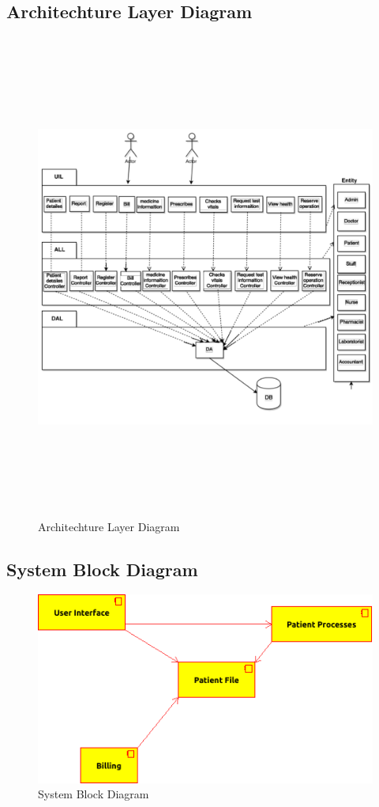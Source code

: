 \documentclass[14pt]{article}
\begin{document}
\subsection{Architechture Layer Diagram}
\begin{figure}[h!]
\centering 
  \caption{Architechture Layer Diagram}
  \includegraphics[height=16cm,keepaspectratio]{LayeredArchitechtureDiagram.pdf}
\end{figure}
\newpage
\subsection{System Block Diagram}
\begin{figure}[h!]
\centering 
  \caption{System Block Diagram}
  \includegraphics[width=\textwidth,keepaspectratio]{SystemBlockDiagram.png}
\end{figure}
\end{document}
